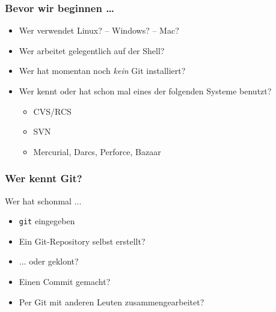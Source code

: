 \documentclass{beamer}
\begin{document}
\begin{frame}
 \frametitle{Bevor wir beginnen \ldots}
  


\begin{itemize}
  \item Wer verwendet Linux? -- Windows? -- Mac?
  \item Wer arbeitet gelegentlich auf der Shell?
  \item Wer hat momentan noch \emph{kein} Git installiert?
\end{itemize}

\begin{itemize}
  \item Wer kennt oder hat schon mal eines der folgenden Systeme benutzt?
\begin{itemize}
  \item CVS/RCS
  \item SVN
  \item Mercurial, Darcs, Perforce, Bazaar
\end{itemize}
\end{itemize}

  
 \end{frame}
\begin{frame}
 \frametitle{Wer kennt Git?}
  


Wer hat schonmal ...
\begin{itemize}
  \item \texttt{git} eingegeben
  \item Ein Git-Repository selbst erstellt?
  \item ... oder geklont?
  \item Einen Commit gemacht?
  \item Per Git mit anderen Leuten zusammengearbeitet?
\end{itemize}

  
 \end{frame}
\end{document}

